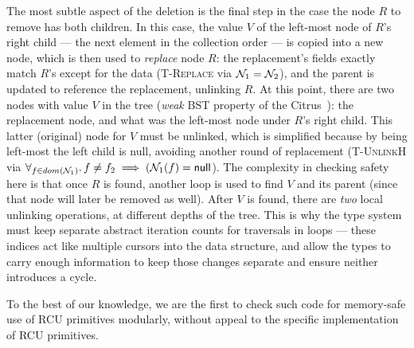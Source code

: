 The most subtle aspect of the deletion is the final step in the case the node $R$ to remove has both children.  In this case, the value $V$ of the left-most node of $R$'s right child --- the next element in the collection order --- is copied into a new node, which is then used to \emph{replace} node $R$: the replacement's fields exactly match $R$'s except for the data (\textsc{T-Replace} via $\mathcal{N}_1 = \mathcal{N}_2$), and the parent is updated to reference the replacement, unlinking $R$.  At this point, there are two nodes with value $V$ in the tree (\textit{weak} BST property of the Citrus~\cite{Arbel:2014:CUR:2611462.2611471}): the replacement node, and what was the left-most node under $R$'s right child. This latter (original) node for $V$ must be unlinked, which is simplified because by being left-most the left child is null, avoiding another round of replacement (\textsc{T-UnlinkH} via $\forall_{f\in dom(\mathcal{N}_1)} \ldotp f\neq f_2 \implies (\mathcal{N}_1(f) = \textsf{null}$).
The complexity in checking safety here is that once $R$ is found, another loop is used to find $V$ and its parent (since that node will later be removed as well).
After $V$ is found, there are \emph{two} local unlinking operations, at different depths of the tree.  This is why the type system must keep separate abstract iteration counts for traversals in loops --- these indices act like multiple cursors into the data structure, and allow the types to carry enough information to keep those changes separate and ensure neither introduces a cycle.

To the best of our knowledge, we are the first to check such code for memory-safe use of RCU primitives modularly, without appeal to the specific implementation of RCU primitives.

